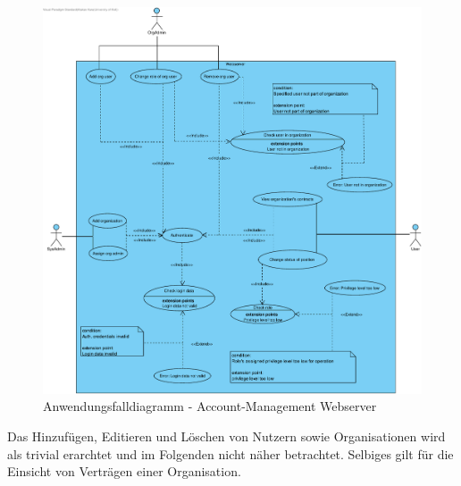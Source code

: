 \begin{figure}[h]
    \centering
    \includegraphics[width=\linewidth]{img/diagrams/Acc_Management_Web.pdf}
    \caption{Anwendungsfalldiagramm - Account-Management Webserver}
    \label{fig:anwendungsfalldiagramm-acc}
\end{figure}

Das Hinzufügen, Editieren und Löschen von Nutzern sowie Organisationen wird als trivial erarchtet und im Folgenden nicht näher betrachtet. Selbiges gilt für die Einsicht von Verträgen einer Organisation.


